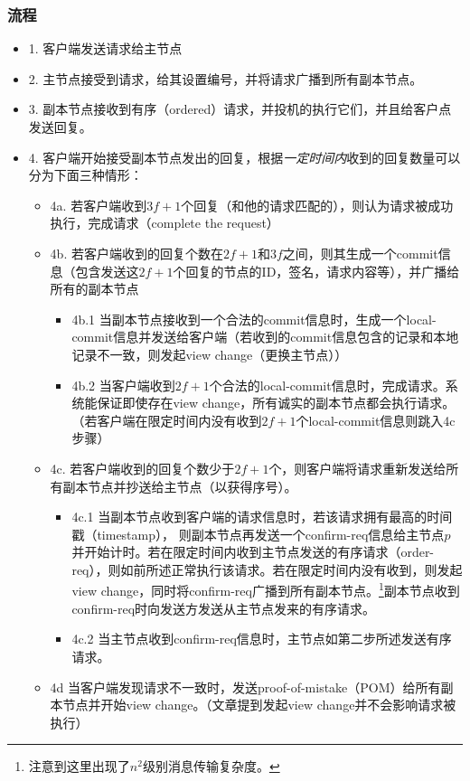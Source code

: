 \subsubsection{流程}
\begin{itemize}
	\item 1. 客户端发送请求给主节点
	\item 2. 主节点接受到请求，给其设置编号，并将请求广播到所有副本节点。
	\item 3. 副本节点接收到有序（ordered）请求，并投机的执行它们，并且给客户点发送回复。
	\item 4. 客户端开始接受副本节点发出的回复，根据\emph{一定时间内}收到的回复数量可以分为下面三种情形：
	   \begin{itemize}
	   	    \item 4a. 若客户端收到$3f+1$个回复（和他的请求匹配的），则认为请求被成功执行，完成请求（complete the request）
	   	    \item 4b. 若客户端收到的回复个数在$2f+1$和$3f$之间，则其生成一个commit信息（包含发送这$2f+1$个回复的节点的ID，签名，请求内容等），并广播给所有的副本节点
	   	        \begin{itemize}
	   	    	\item 4b.1 当副本节点接收到一个合法的commit信息时，生成一个local-commit信息并发送给客户端（若收到的commit信息包含的记录和本地记录不一致，则发起view change（更换主节点））
	   	    	\item 4b.2 当客户端收到$2f+1$个合法的local-commit信息时，完成请求。系统能保证即使存在view change，所有诚实的副本节点都会执行请求。（若客户端在限定时间内没有收到$2f+1$个local-commit信息则跳入4c步骤）
	   	    	\end{itemize}
	   	    \item 4c. 若客户端收到的回复个数少于$2f+1$个，则客户端将请求重新发送给所有副本节点并抄送给主节点（以获得序号）。
	   	     \begin{itemize}
	   	    \item 4c.1 当副本节点收到客户端的请求信息时，若该请求拥有最高的时间戳（timestamp），	则副本节点再发送一个confirm-req信息给主节点$p$并开始计时。若在限定时间内收到主节点发送的有序请求（order-req），则如前所述正常执行该请求。若在限定时间内没有收到，则发起view change，同时将confirm-req广播到所有副本节点。\footnote{注意到这里出现了$n^2$级别消息传输复杂度。}副本节点收到confirm-req时向发送方发送从主节点发来的有序请求。
	   	    \item 4c.2 当主节点收到confirm-req信息时，主节点如第二步所述发送有序请求。
	   	    \end{itemize}
	   	    \item 4d 当客户端发现请求不一致时，发送proof-of-mistake（POM）给所有副本节点并开始view change。（文章提到发起view change并不会影响请求被执行）
	   	\end{itemize}	
\end{itemize}

